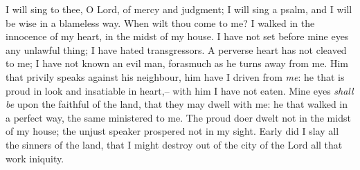  
I will sing to thee, O Lord, of mercy and judgment; I will sing a psalm, and I will be wise in a blameless way. When wilt thou come to me? I walked in the innocence of my heart, in the midst of my house. I have not set before mine eyes any unlawful thing; I have hated transgressors. A perverse heart has not cleaved to me; I have not known an evil man, forasmuch as he turns away from me. Him that privily speaks against his neighbour, him have I driven from \textit{me}: he that is proud in look and insatiable in heart,-- with him I have not eaten. Mine eyes \textit{shall be} upon the faithful of the land, that they may dwell with me: he that walked in a perfect way, the same ministered to me. The proud doer dwelt not in the midst of my house; the unjust speaker prospered not in my sight. Early did I slay all the sinners of the land, that I might destroy out of the city of the Lord all that work iniquity.